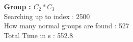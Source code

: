 \textbf{Group : $C_2*C_3$}\\
Searching up to index : 2500\\
How many normal groups are found : 527\\
Total Time in s : 552.8\\
